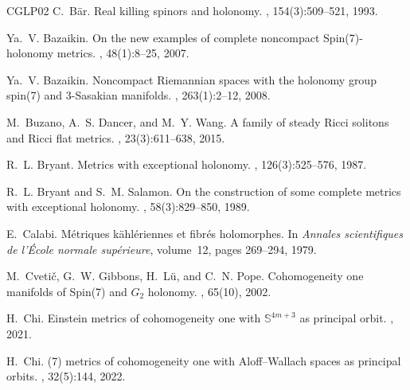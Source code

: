 \documentclass[11pt,letterpaper]{amsart}
\theoremstyle{definition}
\numberwithin{equation}{section}
\begin{document}
\begin{thebibliography}{CGLP02}
C.~B{\"a}r.
\newblock Real killing spinors and holonomy.
, 154(3):509--521, 1993.

Ya.~V. Bazaikin.
\newblock On the new examples of complete noncompact {{Spin}}(7)-holonomy
  metrics.
, 48(1):8--25, 2007.

Ya.~V. Bazaikin.
\newblock Noncompact {{Riemannian}} spaces with the holonomy group spin(7) and
  3-{{Sasakian}} manifolds.
,
  263(1):2--12, 2008.

M.~Buzano, A.~S. Dancer, and M.~Y. Wang.
\newblock A family of steady {{Ricci}} solitons and {{Ricci}} flat metrics.
, 23(3):611--638, 2015.

R.~L. Bryant.
\newblock Metrics with exceptional holonomy.
, 126(3):525--576, 1987.

R.~L. Bryant and S.~M. Salamon.
\newblock On the construction of some complete metrics with exceptional
  holonomy.
, 58(3):829--850, 1989.

E.~Calabi.
\newblock M{\'e}triques k{\"a}hl{\'e}riennes et fibr{\'e}s holomorphes.
\newblock In {\em Annales scientifiques de l'{\'E}cole normale sup{\'e}rieure},
  volume~12, pages 269--294, 1979.

M.~Cveti{\v c}, G.~W. Gibbons, H.~L{\"u}, and C.~N. Pope.
\newblock Cohomogeneity one manifolds of {{Spin}}(7) and {$G_2$} holonomy.
, 65(10), 2002.

H.~Chi.
\newblock Einstein metrics of cohomogeneity one with {$\mathbb{S}^{4m+3}$} as
  principal orbit.
, 2021.

H.~Chi.
(7) metrics of cohomogeneity one with {A}loff--{W}allach
  spaces as principal orbits.
, 32(5):144, 2022.


\end{thebibliography}
\end{document}
